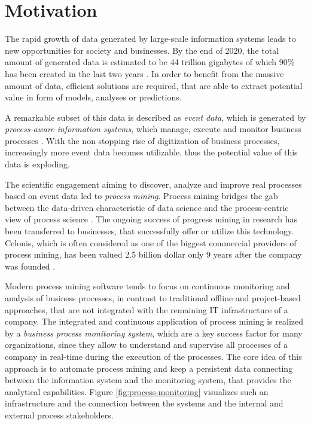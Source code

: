 
\section{Motivation}

The rapid growth of data generated by large-scale information systems leads to new opportunities for  society and businesses. 
By the end of 2020, the total amount of generated data is estimated to be 44 trillion gigabytes of which 90\% has been created in the last two years \cite{datagrowth}.
In order to benefit from the massive amount of data, efficient solutions are required, that are able to extract potential value in form of models, analyses or predictions.

A remarkable subset of this data is described as \textit{event data}, which is generated by \textit{process-aware information systems}, which manage, execute and monitor business processes \cite{DBLP:journals/topnoc/Aalst09}.
With the non stopping rise of digitization of business processes, increasingly more event data becomes utilizable, thus the potential value of this data is exploding.

The scientific engagement aiming to discover, analyze and improve real processes based on event data led to \textit{process mining}. Process mining bridges the gab between the data-driven characteristic of data science and the process-centric view of process science \cite{DBLP:books/sp/Aalst16}.
The ongoing success of progress mining in research has been transferred to businesses, that successfully offer or utilize this technology.
Celonis, which is often considered as one of the biggest commercial providers of process mining, has been valued 2.5 billion dollar only 9 years after the company was founded \cite{celonis}.

Modern process mining software tends to focus on continuous monitoring and analysis of business processes, in contrast to traditional offline and project-based approaches, that are not integrated with the remaining IT infrastructure of a company.
The integrated and continuous application of process mining is realized by a \textit{business process monitoring system}, which are a key success factor for many organizations, since they allow to understand and supervise all processes of a company in real-time during the execution of the processes.
The core idea of this approach is to automate process mining and keep a persistent data connecting between the information system and the monitoring system, that provides the analytical capabilities.
Figure \ref{fig:process-monitoring} visualizes such an infrastructure and the connection between the systems and the internal and external process stakeholders.

